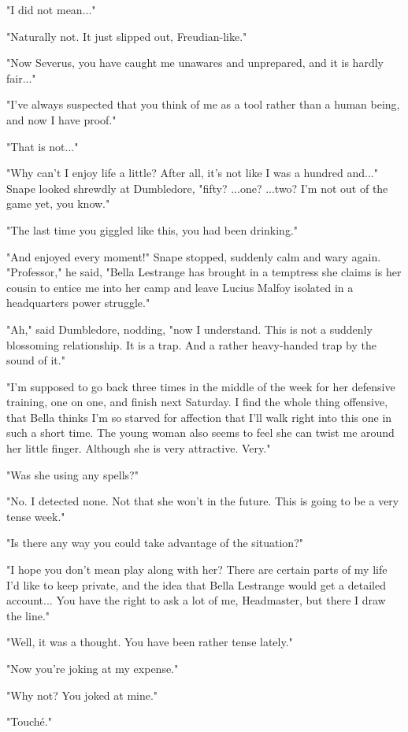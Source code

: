 \documentclass[a4paper,11pt]{article}
\begin{document}
"I did not mean..."

"Naturally not. It just slipped out, Freudian-like."

"Now Severus, you have caught me unawares and unprepared, and it is hardly fair..."

"I've always suspected that you think of me as a tool rather than a human being, and now I have proof."

"That is not..."

"Why can't I enjoy life a little? After all, it's not like I was a hundred and..." Snape looked shrewdly at Dumbledore, "fifty? ...one? ...two? I'm not out of the game yet, you know."

"The last time you giggled like this, you had been drinking."

"And enjoyed every moment!" Snape stopped, suddenly calm and wary again. "Professor," he said, "Bella Lestrange has brought in a temptress she claims is her cousin to entice me into her camp and leave Lucius Malfoy isolated in a headquarters power struggle."

"Ah," said Dumbledore, nodding, "now I understand. This is not a suddenly blossoming relationship. It is a trap. And a rather heavy-handed trap by the sound of it."

"I'm supposed to go back three times in the middle of the week for her defensive training, one on one, and finish next Saturday. I find the whole thing offensive, that Bella thinks I'm so starved for affection that I'll walk right into this one in such a short time. The young woman also seems to feel she can twist me around her little finger. Although she is very attractive. Very."

"Was she using any spells?"

"No. I detected none. Not that she won't in the future. This is going to be a very tense week."

"Is there any way you could take advantage of the situation?"

"I hope you don't mean play along with her? There are certain parts of my life I'd like to keep private, and the idea that Bella Lestrange would get a detailed account... You have the right to ask a lot of me, Headmaster, but there I draw the line."

"Well, it was a thought. You have been rather tense lately."

"Now you're joking at my expense."

"Why not? You joked at mine."

"Touché."
\end{document}
